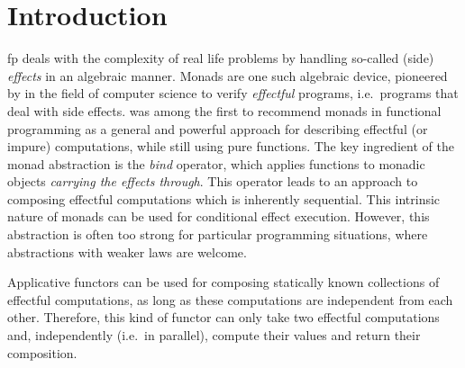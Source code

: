 \documentclass[
  oneside,
  11pt, a4paper,
  footinclude=true,
  headinclude=true,
  cleardoublepage=empty
]{scrbook}
\theoremstyle{definition}
\theoremstyle{definition}
\begin{document}
	\vskip0.5cm
    
	\tableofcontents
	\listoffigures
	\listoftables
	\lstlistoflistings
    \renewcommand{\listtheoremname}{List of theorems and definitions}
	\printglossary[type=\acronymtype]
	\clearpage
	\thispagestyle{empty}

	
	\chapter{Introduction}
        
        
   \label{sec-context}
   
   \gls{fp} deals with the complexity of real life problems by handling so-called (side) \emph{effects} in an algebraic manner. Monads are one such algebraic device, pioneered by \cite{Moggi:1991:NCM:116981.116984} in the field of computer science to verify \emph{effectful} programs, i.e.\ programs that deal with side effects. \cite{Wadler:1989:TF:99370.99404} was among the first to recommend monads in functional programming as a general and powerful approach for describing effectful (or impure) computations, while still using pure functions. The key ingredient of the monad abstraction is the \textit{bind} operator, which applies functions to monadic objects \emph{carrying the effects through}. This operator leads to an approach to composing effectful computations which is inherently sequential. This intrinsic nature of monads can be used for conditional effect execution. However, this abstraction is often too strong for particular programming situations, where abstractions with weaker laws are welcome.

    Applicative functors \citep{mcbride2008applicative} can be used for composing statically known collections of effectful computations, as long as these computations are independent from each other. Therefore, this kind of functor can only take two effectful computations and, independently (i.e.\ in parallel), compute their values and return their composition.
\end{document}
